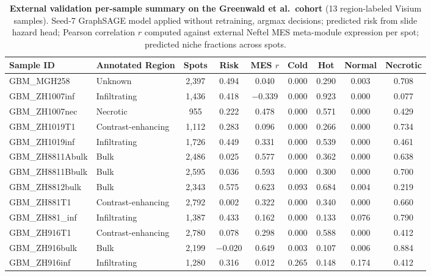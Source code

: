 \documentclass[11pt,letterpaper]{article}
\begin{document}
\vspace{1em}

\begin{table}[H]
\centering
\caption{\textbf{External validation per-sample summary on the Greenwald et al.\ cohort} (13 region-labeled Visium samples). Seed-7 GraphSAGE model applied without retraining, argmax decisions; predicted risk from slide hazard head; Pearson correlation $r$ computed against external Neftel MES meta-module expression per spot; predicted niche fractions across spots.}
\label{tab:s2}
\footnotesize
\setlength{\tabcolsep}{4pt}
\begin{tabular}{llccccccc}
\toprule
\textbf{Sample ID} & \textbf{Annotated Region} & \textbf{Spots} & \textbf{Risk} & \textbf{MES $r$} & \textbf{Cold} & \textbf{Hot} & \textbf{Normal} & \textbf{Necrotic} \\
\midrule
GBM\_MGH258      & Unknown            & 2{,}397 & 0.494  & 0.040  & 0.000 & 0.290 & 0.003 & 0.708 \\
GBM\_ZH1007inf   & Infiltrating       & 1{,}436 & 0.418  & $-$0.339 & 0.000 & 0.923 & 0.000 & 0.077 \\
GBM\_ZH1007nec   & Necrotic           & 955   & 0.222  & 0.478  & 0.000 & 0.571 & 0.000 & 0.429 \\
GBM\_ZH1019T1    & Contrast-enhancing & 1{,}112 & 0.283  & 0.096  & 0.000 & 0.266 & 0.000 & 0.734 \\
GBM\_ZH1019inf   & Infiltrating       & 1{,}726 & 0.449  & 0.331  & 0.000 & 0.539 & 0.000 & 0.461 \\
GBM\_ZH8811Abulk & Bulk               & 2{,}486 & 0.025  & 0.577  & 0.000 & 0.362 & 0.000 & 0.638 \\
GBM\_ZH8811Bbulk & Bulk               & 2{,}595 & 0.036  & 0.593  & 0.000 & 0.300 & 0.000 & 0.700 \\
GBM\_ZH8812bulk  & Bulk               & 2{,}343 & 0.575  & 0.623  & 0.093 & 0.684 & 0.004 & 0.219 \\
GBM\_ZH881T1     & Contrast-enhancing & 2{,}792 & 0.002  & 0.322  & 0.000 & 0.340 & 0.000 & 0.660 \\
GBM\_ZH881\_inf  & Infiltrating       & 1{,}387 & 0.433  & 0.162  & 0.000 & 0.133 & 0.076 & 0.790 \\
GBM\_ZH916T1     & Contrast-enhancing & 2{,}780 & 0.078  & 0.298  & 0.000 & 0.588 & 0.000 & 0.412 \\
GBM\_ZH916bulk   & Bulk               & 2{,}199 & $-$0.020 & 0.649 & 0.003 & 0.107 & 0.006 & 0.884 \\
GBM\_ZH916inf    & Infiltrating       & 1{,}280 & 0.316  & 0.012  & 0.265 & 0.148 & 0.174 & 0.412 \\
\bottomrule
\end{tabular}
\end{table}
\end{document}
